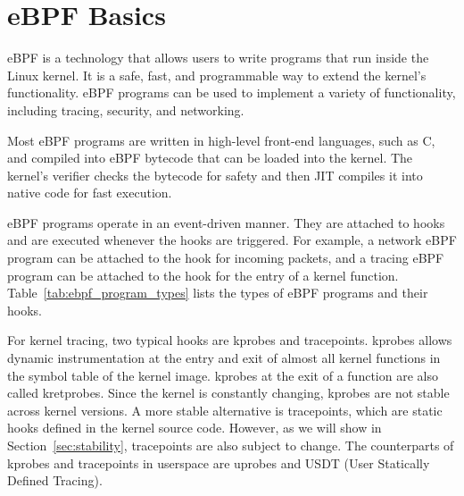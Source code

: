 \section{eBPF Basics}

eBPF is a technology that allows users to write programs that run inside the Linux kernel.
It is a safe, fast, and programmable way to extend the kernel's functionality.
eBPF programs can be used to implement a variety of functionality, including tracing, security, and networking.

Most eBPF programs are written in high-level front-end languages, such as C,
and compiled into eBPF bytecode that can be loaded into the kernel.
The kernel's verifier checks the bytecode for safety and then JIT compiles it into native code for fast execution.

eBPF programs operate in an event-driven manner.
They are attached to hooks and are executed whenever the hooks are triggered.
For example, a network eBPF program can be attached to the hook for incoming packets,
and a tracing eBPF program can be attached to the hook for the entry of a kernel function.
Table~\ref{tab:ebpf_program_types} lists the types of eBPF programs and their hooks.

For kernel tracing, two typical hooks are kprobes and tracepoints.
kprobes allows dynamic instrumentation at the entry and exit of almost all kernel functions in the symbol table of the kernel image.
kprobes at the exit of a function are also called kretprobes.
Since the kernel is constantly changing, kprobes are not stable across kernel versions.
A more stable alternative is tracepoints, which are static hooks defined in the kernel source code.
However, as we will show in Section~\ref{sec:stability}, tracepoints are also subject to change.
The counterparts of kprobes and tracepoints in userspace are uprobes and USDT (User Statically Defined Tracing).



